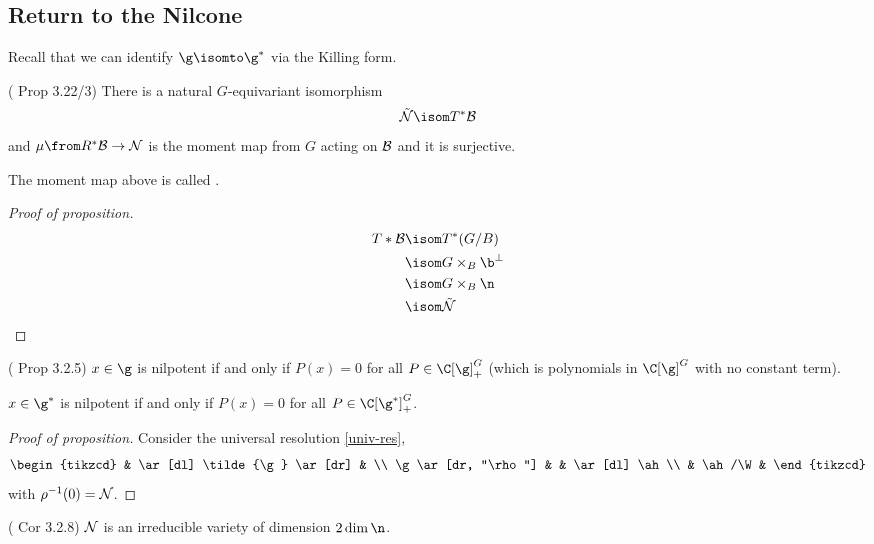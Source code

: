 \subsection{Return to the Nilcone}
\begin{lem}
  Recall that we can identify \(\g \isomto \g^*\) via the Killing
  form. 
\end{lem}
\begin{prop}
  (\cite{cg} Prop 3.22/3) There is a natural \(G\)-equivariant
  isomorphism \[
    \tilde{\cN} \isom T^* \cB
  \]
  and \(\mu \from R^*\cB \to \cN\) is the moment map from \(G\) acting
  on \(\mathcal{B}\) and it is surjective.
\end{prop}
\begin{defn}
  The moment map above is called . 
\end{defn}
\begin{proof}[Proof of proposition]
  \begin{align*}
    T*\cB & \isom T^*(G/B) \\
          & \isom G \times_B \b^\perp \\
          & \isom G \times_B \n \\
          & \isom \tilde{\cN}
  \end{align*}
\end{proof}
\begin{prop}
  (\cite{cg} Prop 3.2.5) \(x \in \g\) is nilpotent if and only if \(P(x) = 0\) for all \(P
  \in \C[\g]^G_+\) (which is polynomials in \(\C[\g]^G\) with no
  constant term).
\end{prop}
\begin{defn}
  \(x \in \g^*\) is nilpotent if and only if \(P(x) = 0\) for all \(P
  \in \C[\g^*]^G_+\).
\end{defn}
\begin{proof}[Proof of proposition]
  Consider the universal resolution \ref{univ-res}, \[
    \begin{tikzcd}
      & \ar[dl] \tilde{\g} \ar[dr] & \\
      \g \ar[dr, "\rho"] & & \ar[dl] \ah  \\
      & \ah/\W & 
    \end{tikzcd}
  \]
  with \(\rho^{-1}(0) = \mathcal{N}\). 
\end{proof}
\begin{cor}
  (\cite{cg} Cor 3.2.8) \(\mathcal{N}\) is an irreducible variety of dimension
  \(2 \dim \n\).
\end{cor}

